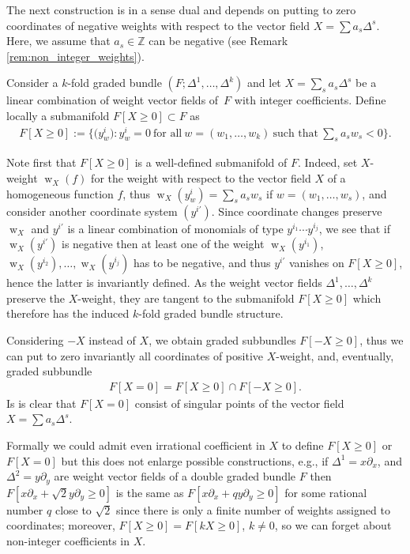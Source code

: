 \documentclass[11pt]{article}
\DeclareMathOperator{\w}{w}
\newcommand{\Zet}{{\mathbb Z}}
\newcommand{\pa}{\partial}
\numberwithin{equation}{section}
\begin{document}
The next construction is in a sense dual and depends on putting to zero coordinates of negative weights with respect to the vector f\/ield $X=\sum a_s \Delta^s$. Here, we assume that $a_s\in \Zet$ can be negative (see Remark \ref{rem:non_integer_weights}).
\begin{Definition}\label{def:removal_coordinates2} Consider a $k$-fold graded bundle $(F; \Delta^1, \ldots, \Delta^k)$ and let $X=\sum_s a_s \Delta^s$ be a linear combination of weight vector f\/ields of~$F$ with integer coef\/f\/icients. Def\/ine locally a submanifold $F[X\geq 0] \subset F$ as
\begin{gather*}
 F[X\geq 0]:= \bigg\{\big(y^i_w\big)\colon y^i_w=0 \  \text{for all} \  w=(w_1, \ldots, w_k)\  \text{such that}\  \sum_s a_s w_s < 0\bigg\}.
\end{gather*}
\end{Definition}

Note f\/irst that $F[X\geq 0]$ is a well-def\/ined submanifold of $F$. Indeed, set $X$-weight $\w_X(f)$ for the weight with respect to the vector f\/ield $X$ of a homogeneous function $f$, thus $\w_X(y^i_w) = \sum_s a_s w_s$ if $w=(w_1, \ldots, w_s)$, and consider another coordinate system $(y^{i'})$. Since coordinate changes preserve $\w_X$ and $y^{i'}$ is a linear combination of monomials of type $y^{i_1}\cdots y^{i_j}$, we see that if $\w_X(y^{i'})$ is negative then at least one of the weight $\w_X(y^{i_1})$, $\w_X(y^{i_2}), \ldots, \w_X(y^{i_j})$ has to be negative, and thus $y^{i'}$ vanishes on $F[X\geq 0]$, hence the latter is invariantly def\/ined. As the weight vector f\/ields $\Delta^1, \ldots, \Delta^k$ preserve the $X$-weight, they are tangent to the submanifold $F[X\geq 0]$ which therefore has the induced $k$-fold graded bundle structure.

Considering $-X$ instead of $X$, we obtain graded subbundles $F[-X\ge 0]$, thus we can put to zero invariantly all coordinates of positive $X$-weight, and, eventually, graded subbundle \begin{gather*}
F[X=0] = F[X\geq 0] \cap F[-X\geq 0].
\end{gather*}
Is is clear that $F[X=0]$ consist of singular points of the vector f\/ield $X = \sum a_s \Delta^s$.

\begin{Remark}\label{rem:non_integer_weights} Formally we could admit even irrational coef\/f\/icient in $X$ to def\/ine $F[X\geq 0]$ or $F[X=0]$ but this does not enlarge possible constructions, e.g., if $\Delta^1 = x \pa_x$, and $\Delta^2 = y\pa_y$ are weight vector f\/ields of a double graded bundle $F$ then $F[x\pa_x + \sqrt{2} y \pa_y\geq 0]$ is the same as $F[x\pa_x + q y \pa_y\geq 0]$ for some rational number $q$ close to $\sqrt{2}$ since there is only a f\/inite number of weights assigned to coordinates; moreover, $F[X\geq 0] = F[k X\geq 0]$, $k\neq 0$, so we can forget about non-integer coef\/f\/icients in $X$.
\end{Remark}
\end{document}

